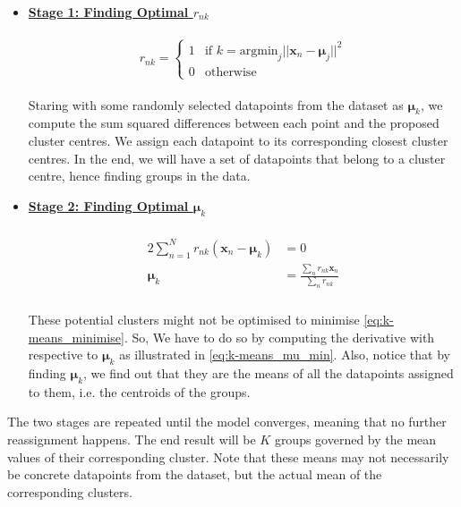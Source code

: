 \newpage
\begin{itemize}
  \item \textbf{\underline{Stage 1: Finding Optimal $r_{nk}$}} \\ \\
	\begin{equation} \label{eq:k-means_r_nk}
		r_{nk} =
		\begin{cases}
			1 & \text{if } k=\mathrm{argmin}_j ||\mathbf{x}_n - \mathbf{\mu}_j||^2\\
			0 & \text{otherwise}
		\end{cases}
  \end{equation} \\
	
  Staring with some randomly selected datapoints from the dataset as $\mathbf{\mu}_k$, we compute the sum squared differences between each point and the proposed cluster centres. We assign each datapoint to its corresponding closest cluster centres. In the end, we will have a set of datapoints that belong to a cluster centre, hence finding groups in the data.
\\
  \item \textbf{\underline{Stage 2: Finding Optimal $\mathbf{\mu}_k$}} \\ \\ 
    \begin{align} \label{eq:k-means_mu_min}
    \begin{split}
    2\sum_{n=1}^{N}r_{nk}(\mathbf{x}_n - \mathbf{\mu}_k) &=  0 \\ 
    \mathbf{\mu}_k &= \frac{\sum_n r_{nk}\mathbf{x}_n}{\sum_n r_{nk}}
    \end{split}
	\end{align} \\
  
  These potential clusters might not be optimised to minimise \autoref{eq:k-means_minimise}. So, We have to do so by computing the derivative with respective to $\mathbf{\mu}_k$ as illustrated in \autoref{eq:k-means_mu_min}. Also, notice that by finding $\mathbf{\mu}_k$, we find out that they are the means of all the datapoints assigned to them, i.e. the centroids of the groups.
\end{itemize}

The two stages are repeated until the model converges, meaning that no further reassignment happens. The end result will be $K$ groups governed by the mean values of their corresponding cluster. Note that these means may not necessarily be concrete datapoints from the dataset, but the actual mean of the corresponding clusters. 

